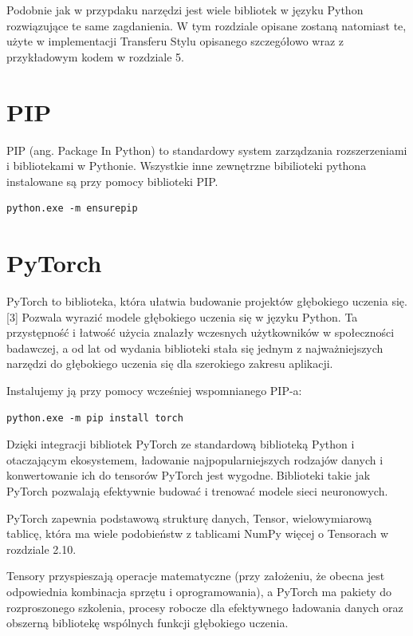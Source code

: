 \documentclass[brudnopis]{xmgr}
\begin{document}
Podobnie jak w przypdaku narzędzi jest wiele bibliotek w języku Python rozwiązujące te same zagdanienia. 
W tym rozdziale opisane zostaną natomiast te, użyte w implementacji Transferu Stylu opisanego szczegółowo wraz z przykładowym kodem w rozdziale 5.

 \section{PIP\label{s:dsssl}}
 PIP (ang. Package In Python) to standardowy system zarządzania rozszerzeniami i bibliotekami w Pythonie. Wszystkie inne zewnętrzne bibilioteki pythona instalowane są przy pomocy biblioteki PIP.

\begin{lstlisting}
python.exe -m ensurepip
\end{lstlisting}


 

    \section{PyTorch\label{s:dsssl}}
    
    
PyTorch to biblioteka, która ułatwia budowanie projektów głębokiego uczenia się. [3] Pozwala wyrazić modele głębokiego uczenia się w języku Python. Ta przystępność i łatwość użycia znalazły wczesnych użytkowników w społeczności badawczej, a od lat od wydania biblioteki stała się jednym z najważniejszych narzędzi do głębokiego uczenia się dla szerokiego zakresu aplikacji.

Instalujemy ją przy pomocy wcześniej wspomnianego PIP-a:

\begin{lstlisting}
python.exe -m pip install torch
\end{lstlisting}


Dzięki integracji bibliotek PyTorch ze standardową biblioteką Python i otaczającym ekosystemem, ładowanie najpopularniejszych rodzajów danych i konwertowanie ich do tensorów PyTorch jest wygodne.􏰹Biblioteki takie jak PyTorch pozwalają efektywnie budować i trenować modele sieci neuronowych.

PyTorch zapewnia podstawową strukturę danych, Tensor, wielowymiarową tablicę, która ma wiele podobieństw z tablicami NumPy więcej o Tensorach w rozdziale 2.10.

 Tensory przyspieszają operacje matematyczne (przy założeniu, że obecna jest odpowiednia kombinacja sprzętu i oprogramowania), a PyTorch ma pakiety do rozproszonego szkolenia, procesy robocze dla efektywnego ładowania danych oraz obszerną bibliotekę wspólnych funkcji głębokiego uczenia.
\end{document}

